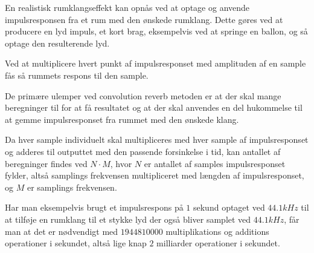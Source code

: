 En realistisk rumklangseffekt kan opnås ved at optage og anvende impulsresponsen fra et rum med den ønskede rumklang.
Dette gøres ved at producere en lyd impuls, et kort brag, eksempelvis ved at springe en ballon, og så optage den resulterende lyd. 

Ved at multiplicere hvert punkt af impulsresponset med amplituden af en sample fås så rummets respons til den sample.

De primære ulemper ved convolution reverb metoden er at der skal mange beregninger til for at få resultatet og at der skal anvendes en del hukommelse til at gemme impulsresponset fra rummet med den ønskede klang.

Da hver sample individuelt skal multipliceres med hver sample af impulsresponset og adderes til outputtet med den passende forsinkelse i tid, kan antallet af beregninger findes ved $N \cdot M$, hvor $N$ er antallet af samples impulsresponset fylder, altså samplings frekvensen multipliceret med længden af impulsresponset, og $M$ er samplings frekvensen.

Har man eksempelvis brugt et impulsrespons på $1$ sekund optaget ved $44.1\si{kHz}$ til at tilføje en rumklang til et stykke lyd der også bliver samplet ved $44.1\si{kHz}$, får man at det er nødvendigt med $1944810000$ multiplikations og additions  operationer i sekundet, altså lige knap $2$ milliarder operationer i sekundet. 

